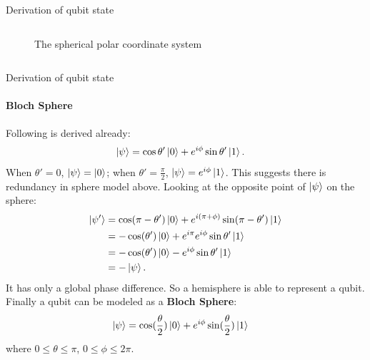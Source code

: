 \documentclass{beamer}
\begin{document}
\begin{frame}{Derivation of qubit state\tiny\cite{blochsphere}}
{\begin{columns}
\begin{figure}
      \caption{The spherical polar coordinate system\tiny\cite{sphericalpolarcoordinate}}
    \end{figure}
  \end{columns}
  }%
\end{frame}

\begin{frame}{Derivation of qubit state\tiny\cite{blochsphere}}
  \framesubtitle{Bloch Sphere}
  {\tiny
  Following is derived already:
  \begin{align*}
    \ket{\psi} &= \cos\theta'\ket{0}+e^{i\phi}\sin\theta'\ket{1} .
  \end{align*}
  When $\theta'=0$, $\ket{\psi}=\ket{0}$; when $\theta'=\frac{\pi}2$, $\ket{\psi}=e^{i\phi}\ket{1}$.
  This suggests there is redundancy in sphere model above.
  Looking at the opposite point of $\ket{\psi}$ on the sphere:
  \begin{align*}
    \ket{\psi'} &= \cos(\pi-\theta')\ket{0}+e^{i(\pi+\phi)}\sin(\pi-\theta')\ket{1} \\
     &= -\cos(\theta')\ket{0}+e^{i\pi}e^{i\phi}\sin\theta'\ket{1} \\
     &= -\cos(\theta')\ket{0}-e^{i\phi}\sin\theta'\ket{1} \\
     &= -\ket{\psi} .
  \end{align*}
  It has only a global phase difference. So a hemisphere is able to represent a qubit. Finally a qubit can be modeled as a \textbf{Bloch Sphere}:
  \begin{align*}
    \ket{\psi} &= \cos(\frac{\theta}2)\ket{0}+e^{i\phi}\sin(\frac{\theta}2)\ket{1}
  \end{align*}
  where $0\leqslant\theta\leqslant\pi$, $0\leqslant\phi\leqslant2\pi$.
  }%
\end{frame}
\end{document}
